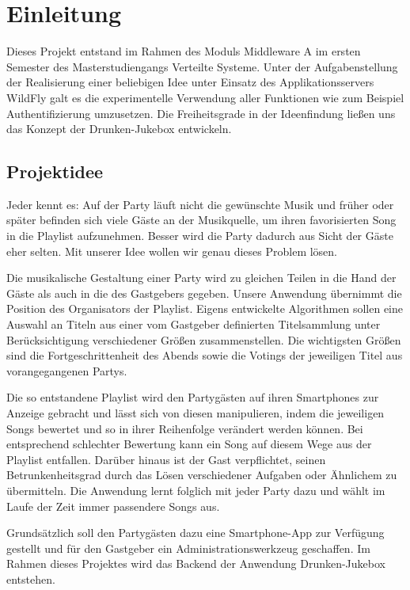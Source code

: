 \section{Einleitung}
Dieses Projekt entstand im Rahmen des Moduls Middleware A im ersten Semester des Masterstudiengangs Verteilte Systeme. Unter der Aufgabenstellung der Realisierung einer beliebigen Idee unter Einsatz des Applikationsservers WildFly galt es die experimentelle Verwendung aller Funktionen wie zum Beispiel Authentifizierung umzusetzen.
Die Freiheitsgrade in der Ideenfindung ließen uns das Konzept der Drunken-Jukebox entwickeln.

\subsection{Projektidee}
Jeder kennt es: Auf der Party läuft nicht die gewünschte Musik und früher oder später befinden sich viele Gäste an der Musikquelle, um ihren favorisierten Song in die Playlist aufzunehmen. Besser wird die Party dadurch aus Sicht der Gäste eher selten. Mit unserer Idee wollen wir genau dieses Problem lösen.

Die musikalische Gestaltung einer Party wird zu gleichen Teilen in die Hand der Gäste als auch in die des Gastgebers gegeben. Unsere Anwendung übernimmt die Position des Organisators der Playlist. Eigens entwickelte Algorithmen sollen eine Auswahl an Titeln aus einer vom Gastgeber definierten Titelsammlung unter Berücksichtigung verschiedener Größen zusammenstellen. Die wichtigsten Größen sind die Fortgeschrittenheit des Abends sowie die Votings der jeweiligen Titel aus vorangegangenen Partys.

Die so entstandene Playlist wird den Partygästen auf ihren Smartphones zur Anzeige gebracht und lässt sich von diesen manipulieren, indem die jeweiligen Songs bewertet und so in ihrer Reihenfolge verändert werden können. Bei entsprechend schlechter Bewertung kann ein Song auf diesem Wege aus der Playlist entfallen. Darüber hinaus ist der Gast verpflichtet, seinen Betrunkenheitsgrad durch das Lösen verschiedener Aufgaben oder Ähnlichem zu übermitteln. Die Anwendung lernt folglich mit jeder Party dazu und wählt im Laufe der Zeit immer passendere Songs aus. 

Grundsätzlich soll den Partygästen dazu eine Smartphone-App zur Verfügung gestellt und für den Gastgeber ein Administrationswerkzeug geschaffen. Im Rahmen dieses Projektes wird das Backend der Anwendung Drunken-Jukebox entstehen. 